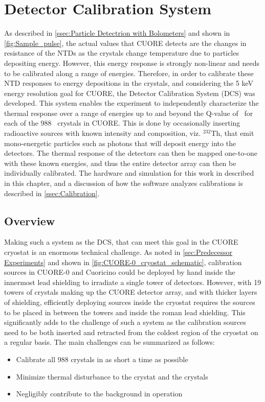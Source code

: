 \chapter{Detector Calibration System}
\label{chap:DCS}

As described in \autoref{ssec:Particle Detectrion with Bolometers} and shown in \autoref{fig:Sample_pulse}, the actual values that CUORE detects are the changes in resistance of the NTDs as the crystals change temperature due to particles depositing energy.
However, this energy response is strongly non-linear and needs to be calibrated along a range of energies.
Therefore, in order to calibrate these NTD responses to energy depositions in the crystals, and considering the 5 keV energy resolution goal for CUORE, the Detector Calibration System (DCS) was developed.
This system enables the experiment to independently characterize the thermal response over a range of energies up to and beyond the Q-value of \zeronubb~for each of the 988 \teotwo~crystals in CUORE.
This is done by occasionally inserting radioactive sources with known intensity and composition, viz. $^{232}$Th, that emit mono-energetic particles such as photons that will deposit energy into the detectors.
The thermal response of the detectors can then be mapped one-to-one with these known energies, and thus the entire detector array can then be individually calibrated. The hardware and simulation for this work in described in this chapter, and a discussion of how the software analyzes calibrations is described in \autoref{ssec:Calibration}.

\section{Overview}

Making such a system as the DCS, that can meet this goal in the CUORE cryostat is an enormous technical challenge.
As noted in \autoref{sec:Predecessor Experiments} and shown in \autoref{fig:CUORE-0_cryostat_schematic}, calibration sources in CUORE-0 and Cuoricino could be deployed by hand inside the innermost lead shielding to irradiate a single tower of detectors.
However, with 19 towers of crystals making up the CUORE detector array, and with thicker layers of shielding, efficiently deploying sources inside the cryostat requires the sources to be placed in between the towers and inside the roman lead shielding.
This significantly adds to the challenge of such a system as the calibration sources need to be both inserted and retracted from the coldest region of the cryostat on a regular basis.
The main challenges can be summarized as follows: 
\begin{itemize}
\item Calibrate all 988 crystals in as short a time as possible
\item Minimize thermal disturbance to the crystat and the crystals
\item Negligibly contribute to the background in operation
\end{itemize}

